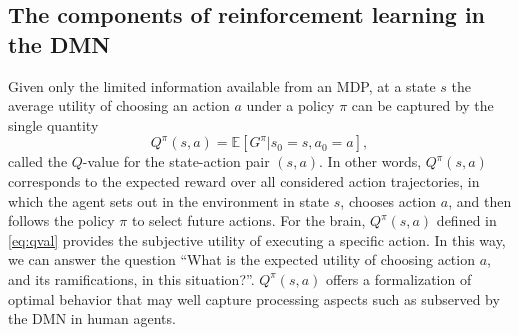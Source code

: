 \documentclass[10pt,letterpaper]{article}
\def\V{\mathbf{V}}
\begin{document}
\subsection{The components of reinforcement learning in the DMN}
Given only the limited information available from an MDP, at a state $s$ the average
utility of choosing an action $a$ under a policy $\pi$ can be captured by the single quantity
\begin{equation}
  \label{eq:qval}
  Q^{\pi}(s,a) = \mathbb E [G^\pi|s_0=s,a_0=a],
\end{equation}
called the $Q$-value for the state-action pair $(s,a)$.
In other words, $Q^{\pi}(s,a)$ corresponds to the expected reward
over all considered action trajectories, in which
the agent sets out in the environment in state
$s$, chooses action $a$, and then follows the policy $\pi$ to select future actions.
For the brain,
$Q^{\pi}(s, a)$ defined in \eqref{eq:qval} provides the subjective
utility of executing a specific action.
In this way, we can answer the question
``What is the expected utility of choosing action $a$, and its ramifications, in this situation?''.
$Q^{\pi}(s,a)$ offers a formalization of optimal behavior that
may well capture processing aspects such as subserved by the DMN in human agents.



\end{document}
